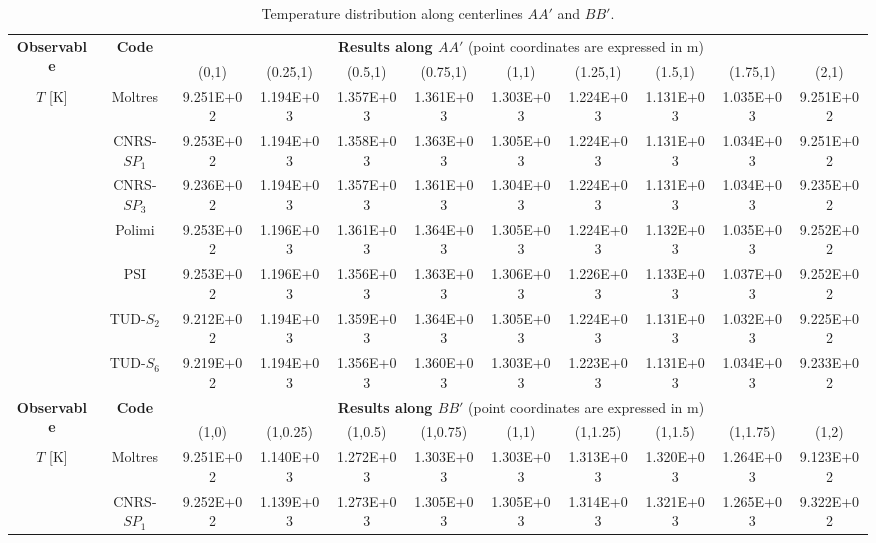 \begin{table*}[htb]
	\caption{Temperature distribution along centerlines $AA'$ and $BB'$.}
	\centering
	\footnotesize
	\setlength\tabcolsep{1.5pt}
 	\hspace*{-2cm}
	\begin{tabular}{c c c c c c c c c c c}
		\toprule
		\multirow{2}{*}{\textbf{Observable}} & \multirow{2}{*}{\textbf{Code}} & \multicolumn{9}{c}{\textbf{Results along $AA'$} (point coordinates are expressed in m)} \\
		& & {(0,1)} & {(0.25,1)} & {(0.5,1)} & {(0.75,1)} & {(1,1)} & {(1.25,1)} & {(1.5,1)} & {(1.75,1)} & {(2,1)} \\
		\midrule
		\multirow{7}{*}{$T$ [K]} & Moltres & 9.251E+02 & 1.194E+03 & 1.357E+03 & 1.361E+03 &
		1.303E+03 & 1.224E+03 & 1.131E+03 & 1.035E+03 & 9.251E+02 \\
		& CNRS-$SP_1$ & 9.253E+02 & 1.194E+03 & 1.358E+03 & 1.363E+03 & 1.305E+03 & 1.224E+03 & 1.131E+03 & 1.034E+03 & 9.251E+02 \\
		& CNRS-$SP_3$ & 9.236E+02 & 1.194E+03 & 1.357E+03 & 1.361E+03 & 1.304E+03 & 1.224E+03 & 1.131E+03 & 1.034E+03 & 9.235E+02 \\
		& Polimi & 9.253E+02 & 1.196E+03 & 1.361E+03 & 1.364E+03 & 1.305E+03 & 1.224E+03 & 1.132E+03 & 1.035E+03 & 9.252E+02 \\
		& PSI & 9.253E+02 & 1.196E+03 & 1.356E+03 & 1.363E+03 & 1.306E+03 & 1.226E+03 & 1.133E+03 & 1.037E+03 & 9.252E+02 \\
		& TUD-$S_2$ & 9.212E+02 & 1.194E+03 & 1.359E+03 & 1.364E+03 & 1.305E+03 & 1.224E+03 & 1.131E+03 & 1.032E+03 & 9.225E+02 \\
		& TUD-$S_6$ & 9.219E+02 & 1.194E+03 & 1.356E+03 & 1.360E+03 & 1.303E+03 & 1.223E+03 & 1.131E+03 & 1.034E+03 & 9.233E+02 \\
		\midrule
		\midrule
		\multirow{2}{*}{\textbf{Observable}} & \multirow{2}{*}{\textbf{Code}} & \multicolumn{9}{c}{\textbf{Results along $BB'$} (point coordinates are expressed in m)} \\
		& & {(1,0)} & {(1,0.25)} & {(1,0.5)} & {(1,0.75)} & {(1,1)} & {(1,1.25)} & {(1,1.5)} & {(1,1.75)} & {(1,2)} \\
		\midrule
		\multirow{7}{*}{$T$ [K]} & Moltres & 9.251E+02 & 1.140E+03 & 1.272E+03 & 1.303E+03 &
		1.303E+03 & 1.313E+03 & 1.320E+03 & 1.264E+03 & 9.123E+02 \\
		& CNRS-$SP_1$ & 9.252E+02 & 1.139E+03 & 1.273E+03 & 1.305E+03 & 1.305E+03 & 1.314E+03 & 1.321E+03 & 1.265E+03 & 9.322E+02 \\

\end{tabular}
\end{table*}
